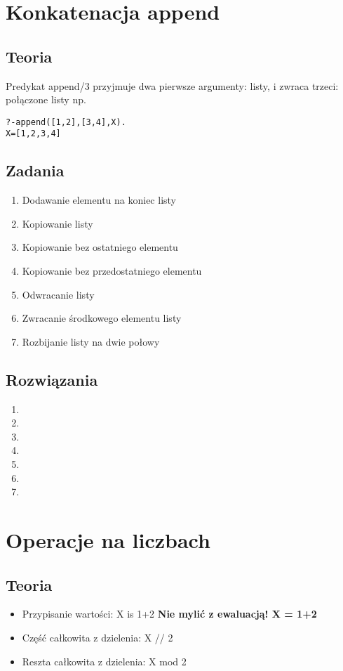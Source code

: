 \documentclass[10pt,a4paper]{article}
\begin{document}
\section{Konkatenacja append}
\subsection{Teoria}
Predykat append/3 przyjmuje dwa pierwsze argumenty: listy, i zwraca trzeci: połączone listy
np.
\begin{verbatim}
?-append([1,2],[3,4],X).
X=[1,2,3,4]
\end{verbatim}
\subsection{Zadania}
\begin{enumerate}
\item Dodawanie elementu na koniec listy
\item Kopiowanie listy
\item Kopiowanie bez ostatniego elementu
\item Kopiowanie bez przedostatniego elementu
\item Odwracanie listy
\item Zwracanie środkowego elementu listy
\item Rozbijanie listy na dwie połowy
\end{enumerate}
\subsection{Rozwiązania}
\begin{enumerate}
\item
\item
\item
\item
\item
\item
\item
\end{enumerate}
\section{Operacje na liczbach}
\subsection{Teoria}
\begin{itemize}
\item Przypisanie wartości: X is 1+2
\textbf{Nie mylić z ewaluacją! X = 1+2}
\item Część całkowita z dzielenia: X // 2
\item Reszta całkowita z dzielenia: X mod 2
\end{itemize}
\end{document}
